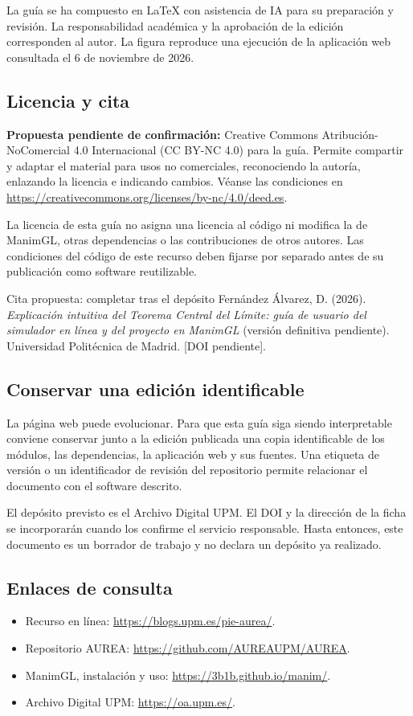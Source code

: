 \documentclass[11pt,a4paper]{article}
\newcommand{\web}{\url{https://blogs.upm.es/pie-aurea/}}
\begin{document}
La guía se ha compuesto en LaTeX con asistencia de IA para su preparación y revisión. La responsabilidad académica y la aprobación de la edición corresponden al autor. La figura reproduce una ejecución de la aplicación web consultada el 6 de noviembre de 2026.

\subsection{Licencia y cita}
\textbf{Propuesta pendiente de confirmación:} Creative Commons Atribución-NoComercial 4.0 Internacional (CC BY-NC 4.0) para la guía. Permite compartir y adaptar el material para usos no comerciales, reconociendo la autoría, enlazando la licencia e indicando cambios. Véanse las condiciones en \url{https://creativecommons.org/licenses/by-nc/4.0/deed.es}.

La licencia de esta guía no asigna una licencia al código ni modifica la de ManimGL, otras dependencias o las contribuciones de otros autores. Las condiciones del código de este recurso deben fijarse por separado antes de su publicación como software reutilizable.

\begin{nota}{Cita propuesta: completar tras el depósito}
Fernández Álvarez, D. (2026). \emph{Explicación intuitiva del Teorema Central del Límite: guía de usuario del simulador en línea y del proyecto en ManimGL} (versión definitiva pendiente). Universidad Politécnica de Madrid. [DOI pendiente].
\end{nota}

\subsection{Conservar una edición identificable}
La página web puede evolucionar. Para que esta guía siga siendo interpretable conviene conservar junto a la edición publicada una copia identificable de los módulos, las dependencias, la aplicación web y sus fuentes. Una etiqueta de versión o un identificador de revisión del repositorio permite relacionar el documento con el software descrito.

El depósito previsto es el Archivo Digital UPM. El DOI y la dirección de la ficha se incorporarán cuando los confirme el servicio responsable. Hasta entonces, este documento es un borrador de trabajo y no declara un depósito ya realizado.

\subsection{Enlaces de consulta}
\begin{itemize}
\item Recurso en línea: \web.
\item Repositorio AUREA: \url{https://github.com/AUREAUPM/AUREA}.
\item ManimGL, instalación y uso: \url{https://3b1b.github.io/manim/}.
\item Archivo Digital UPM: \url{https://oa.upm.es/}.
\end{itemize}
\end{document}
